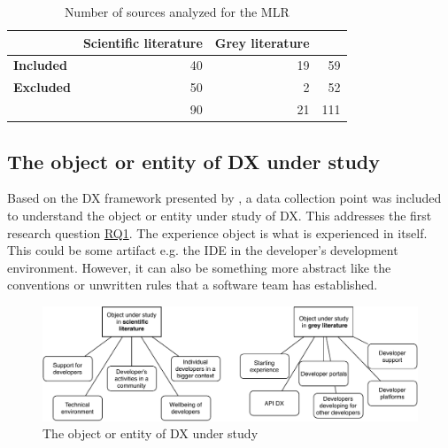 \documentclass[english, 12pt, a4paper, sci, utf8, a-1b, online]{aaltothesis}
\begin{document}
\begin{table}[ht]
  \begin{center}
    \begin{tabular}{l | r r | r}
                        & \textbf{Scientific literature} & \textbf{Grey literature} &     \\
      \hline
      \textbf{Included} & 40                             & 19                       & 59  \\
      \textbf{Excluded} & 50                             & 2                        & 52  \\
      \hline
                        & 90                             & 21                       & 111
    \end{tabular}
    \captionsetup{width=0.6\textwidth}
    \caption{Number of sources analyzed for the MLR}
    \label{table:number-of-sources}
  \end{center}
\end{table}

\subsection{The object or entity of DX under study}

Based on the DX framework presented by \textcite{fagerholm-doctoral-thesis}, a data collection point was included to understand the object or entity under study of DX. This addresses the first research question \hyperref[RQ1]{RQ1}. The experience object is what is experienced in itself. This could be some artifact e.g. the IDE in the developer's development environment. However, it can also be something more abstract like the conventions or unwritten rules that a software team has established.

\begin{figure}[h]
  \begin{center}
    \includegraphics[width=\textwidth]{object-under-study.pdf}
  \end{center}
  \captionsetup{width=0.6\textwidth}
  \caption{The object or entity of DX under study}
  \label{figure:object-under-study}
\end{figure}
\end{document}
